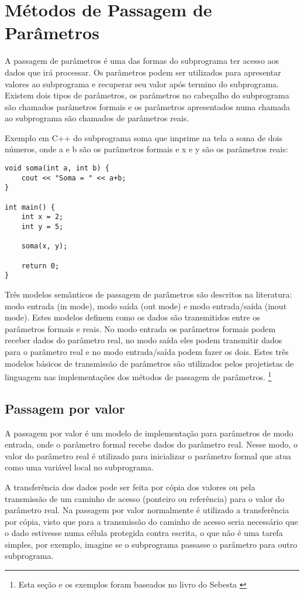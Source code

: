 \section{Métodos de Passagem de Parâmetros} %
\label{sec:metodos_passagem_parametros}
A passagem de parâmetros é uma das formas do subprograma ter acesso aos dados que irá processar. 
Os parâmetros podem ser utilizados para apresentar valores ao subprograma e recuperar seu valor após termino do subprograma. Existem dois tipos de parâmetros, os parâmetros no cabeçalho do subprograma são chamados parâmetros formais e os parâmetros apresentados numa chamada ao subprograma são chamados de parâmetros reais. 

Exemplo em C++  do subprograma soma que imprime na tela a soma de dois números, onde a e b são os parâmetros formais e x e y são os parâmetros reais:
\begin{verbatim}
void soma(int a, int b) {
    cout << "Soma = " << a+b; 
}

int main() {
    int x = 2;
    int y = 5;
    
    soma(x, y);
   
    return 0;
}
\end{verbatim}

Três modelos semânticos de passagem de parâmetros são descritos na literatura: modo entrada (in mode), modo saída (out mode) e modo entrada/saída (inout mode). Estes modelos definem como os dados são transmitidos entre os parâmetros formais e reais. No modo entrada os parâmetros formais podem receber dados do parâmetro real, no modo saída eles podem transmitir dados para o parâmetro real e no modo entrada/saída podem fazer os dois. Estes três modelos básicos de transmissão de parâmetros são utilizados pelos projetistas de linguagem nas implementações dos métodos de passagem de parâmetros. \footnote[1]{Esta seção e os exemplos foram baseados no livro do Sebesta \cite{sebesta}}


\subsection{Passagem por valor}
A passagem por valor é um modelo de implementação para parâmetros de modo entrada, onde o parâmetro formal recebe dados do parâmetro real. Nesse modo, o valor do parâmetro real é utilizado para inicializar o parâmetro formal que atua como uma variável local no subprograma.

A transferência dos dados pode ser feita por cópia dos valores ou pela transmissão de um caminho de acesso (ponteiro ou referência) para o valor do parâmetro real. Na passagem por valor normalmente é utilizado a transferência por cópia, visto que para a transmissão do caminho de acesso seria necessário que o dado estivesse numa célula protegida contra escrita, o que não é uma tarefa simples, por exemplo, imagine se o subprograma passasse o parâmetro para outro subprograma.

